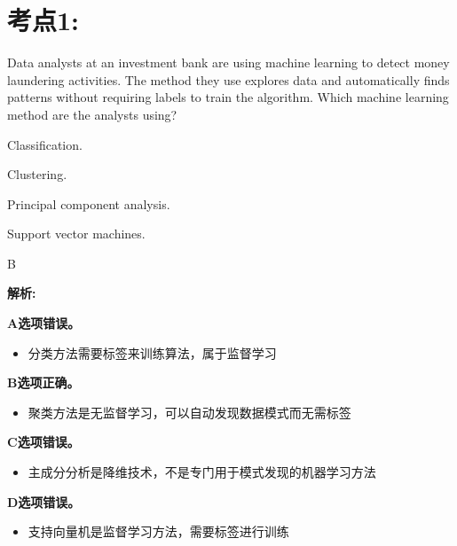 \documentclass{article}
\newcounter{question} %
\newenvironment{explanation}
{\textbf{解析:}\par}
{\par}
\begin{document}
 \tableofcontents %
\newpage




\section{考点1:}
\setcounter{question}{0}


\begin{question}
    Data analysts at an investment bank are using machine learning to detect money laundering activities. The method they use explores data and automatically finds patterns without requiring labels to train the algorithm. Which machine learning method are the analysts using?
\end{question}

\begin{choices}
    \item Classification.
    \item Clustering.
    \item Principal component analysis.
    \item Support vector machines.
\end{choices}

\begin{correctanswer}
    B
\end{correctanswer}

\begin{explanation}
    \textbf{A选项错误。}
    \begin{itemize}
        \item 分类方法需要标签来训练算法，属于监督学习
    \end{itemize}
    
    \textbf{B选项正确。}
    \begin{itemize}
        \item 聚类方法是无监督学习，可以自动发现数据模式而无需标签
    \end{itemize}
    
    \textbf{C选项错误。}
    \begin{itemize}
        \item 主成分分析是降维技术，不是专门用于模式发现的机器学习方法
    \end{itemize}
    
    \textbf{D选项错误。}
    \begin{itemize}
        \item 支持向量机是监督学习方法，需要标签进行训练
    \end{itemize}
\end{explanation}
\end{document}
